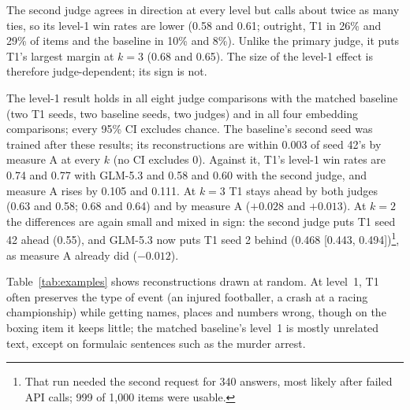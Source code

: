 \documentclass[11pt]{article}
\begin{document}
The second judge agrees in direction at every level but calls about twice as many ties, so its level-1 win rates are lower (0.58 and 0.61; outright, T1 in 26\% and 29\% of items and the baseline in 10\% and 8\%). Unlike the primary judge, it puts T1's largest margin at $k{=}3$ (0.68 and 0.65). The size of the level-1 effect is therefore judge-dependent; its sign is not.

The level-1 result holds in all eight judge comparisons with the matched baseline (two T1 seeds, two baseline seeds, two judges) and in all four embedding comparisons; every 95\% CI excludes chance. The baseline's second seed was trained after these results; its reconstructions are within 0.003 of seed 42's by measure A at every $k$ (no CI excludes 0). Against it, T1's level-1 win rates are 0.74 and 0.77 with GLM-5.3 and 0.58 and 0.60 with the second judge, and measure A rises by 0.105 and 0.111. At $k{=}3$ T1 stays ahead by both judges (0.63 and 0.58; 0.68 and 0.64) and by measure A ($+0.028$ and $+0.013$). At $k{=}2$ the differences are again small and mixed in sign: the second judge puts T1 seed 42 ahead (0.55), and GLM-5.3 now puts T1 seed 2 behind (0.468 [0.443, 0.494])\footnote{That run needed the second request for 340 answers, most likely after failed API calls; 999 of 1{,}000 items were usable.}, as measure A already did ($-0.012$).

Table~\ref{tab:examples} shows reconstructions drawn at random. At level~1, T1 often preserves the type of event (an injured footballer, a crash at a racing championship) while getting names, places and numbers wrong, though on the boxing item it keeps little; the matched baseline's level~1 is mostly unrelated text, except on formulaic sentences such as the murder arrest.
\end{document}
